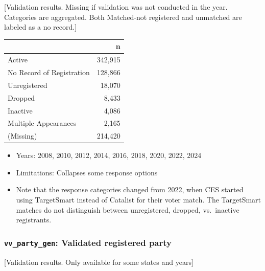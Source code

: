 \documentclass[10pt,article,oneside]{memoir}
\begin{document}
{[}Validation results. Missing if validation was not conducted in the
year. Categories are aggregated. Both Matched-not registered and
unmatched are labeled as a no record.{]}

\begin{table}[H]
\centering
\begin{tabular}[t]{lr}
\toprule
 & n\\
\midrule
Active & 342,915\\
No Record of Registration & 128,866\\
Unregistered & 18,070\\
Dropped & 8,433\\
Inactive & 4,086\\
Multiple Appearances & 2,165\\
(Missing) & 214,420\\
\bottomrule
\end{tabular}
\end{table}

\begin{itemize}
\tightlist
\item
  Years: 2008, 2010, 2012, 2014, 2016, 2018, 2020, 2022, 2024
\item
  Limitations: Collapses some response options
\item
  Note that the response categories changed from 2022, when CES started
  using TargetSmart instead of Catalist for their voter match. The
  TargetSmart matches do not distinguish between unregistered, dropped,
  vs.~inactive registrants.
\end{itemize}

\subsubsection{\texorpdfstring{\texttt{vv\_party\_gen}: Validated
registered
party}{vv\_party\_gen: Validated registered party}}\label{vv_party_gen-validated-registered-party}

{[}Validation results. Only available for some states and years{]}
\end{document}
